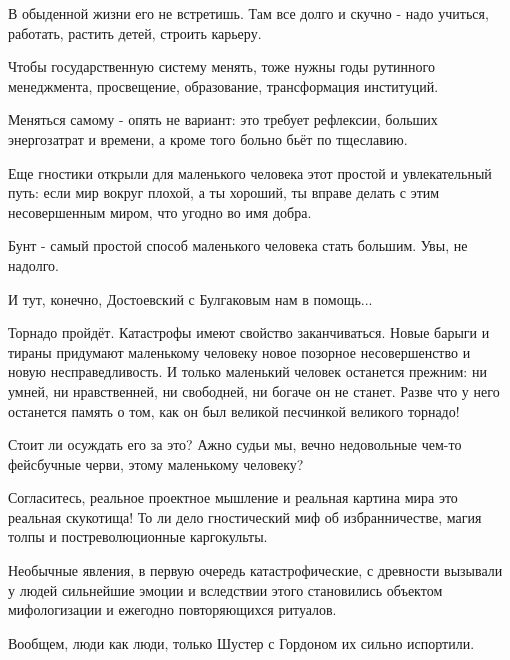 В обыденной жизни его не встретишь. Там все долго и скучно - надо  учиться,
работать, растить детей,  строить карьеру.

Чтобы государственную систему менять, тоже нужны годы рутинного менеджмента,
просвещение, образование, трансформация институций.

Меняться самому -  опять не вариант: это требует рефлексии, больших
энергозатрат и времени, а кроме того больно бьёт по тщеславию.

Еще гностики открыли для маленького человека этот простой и увлекательный путь:
если мир вокруг плохой, а ты хороший, ты вправе делать с этим несовершенным
миром, что угодно во имя добра.

Бунт - самый простой способ маленького человека стать большим. Увы, не надолго.

И тут, конечно, Достоевский с Булгаковым нам в помощь...

Торнадо пройдёт. Катастрофы имеют свойство заканчиваться. Новые барыги и тираны
придумают маленькому человеку  новое позорное несовершенство и новую
несправедливость. И только маленький человек останется  прежним: ни умней, ни
нравственней, ни свободней, ни богаче он не станет. Разве что у него останется
память о том, как он был великой песчинкой великого торнадо!

Стоит ли осуждать его за это? Ажно судьи мы, вечно  недовольные чем-то
фейсбучные черви, этому маленькому человеку?

Согласитесь, реальное проектное мышление и реальная картина мира это реальная
скукотища! То ли дело гностический миф об избранничестве, магия толпы и
постреволюционные каргокульты.

Необычные явления, в первую очередь катастрофические, с древности вызывали у
людей сильнейшие эмоции и вследствии этого становились объектом мифологизации и
ежегодно повторяющихся ритуалов.

Вообщем, люди как люди, только Шустер с Гордоном их сильно испортили.
